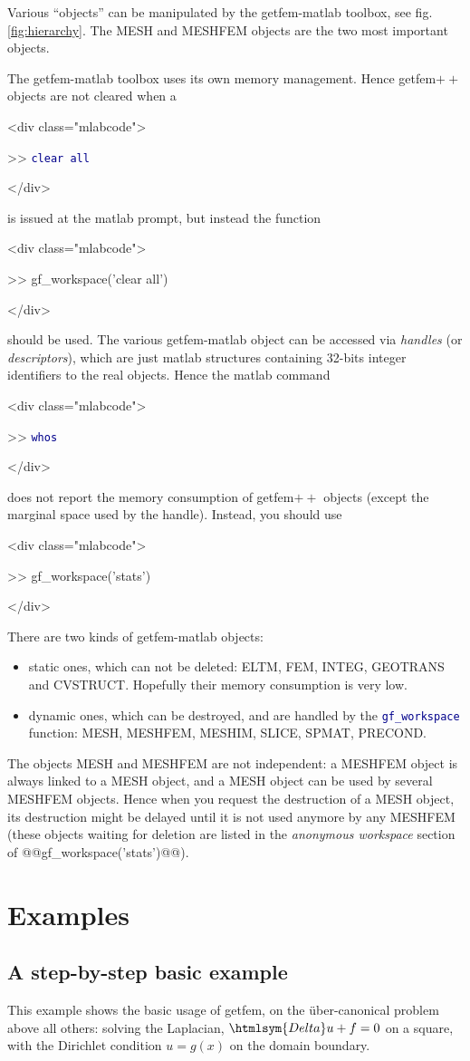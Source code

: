 \documentclass[11pt,a4paper]{article}
\newcommand{\sf}[1]{#1}
\newcommand{\Delta}{\htmlsym{Delta}}
\newcommand{\kw}[1]{\textcolor{darkblue}{\texttt{#1}}}
\newenvironment{matlab}{\begin{rawxml}<div class="mlabcode">\end{rawxml}\begin{example}}{\end{example}\begin{rawxml}</div>\end{rawxml}}
\newcommand{\kw}[1]{\textcolor{darkblue}{\texttt{#1}}}
\newenvironment{matlab}{\begin{alltt}}{\end{alltt}}
\newcommand{\mlab}{{\sf matlab}\xspace}
\newcommand{\gf}{{\sf getfem${++}$}\xspace}
\newcommand{\gfm}{{\sf getfem-matlab}\xspace}
\begin{document}
Various ``objects'' can be manipulated by the \gfm toolbox, see fig. \ref{fig:hierarchy}. The MESH and MESHFEM objects are the two most important objects. 

The \gfm toolbox uses its own memory management. Hence \gf objects are
not cleared when a 
\begin{matlab}
>> \kw{clear all}
\end{matlab}
is issued at the \mlab prompt, but
instead the function 
\begin{matlab}
>> gf\_workspace('clear all')
\end{matlab}
should be used. The various \gfm object can be accessed via \textit{handles} (or
\textit{descriptors}), which are just \mlab structures containing 32-bits integer identifiers to
the real objects. Hence the \mlab command 
\begin{matlab}
>> \kw{whos}
\end{matlab}
does not report the memory consumption of \gf objects (except the marginal space
 used by the handle). Instead, you should use
\begin{matlab}
>> gf\_workspace('stats')
\end{matlab}

There are two kinds of \gfm objects:
\begin{itemize}
\item static ones, which can not be deleted: ELTM, FEM, INTEG,
  GEOTRANS and CVSTRUCT. Hopefully their memory consumption is very low.
\item dynamic ones, which can be destroyed, and are handled by the
  \kw{gf\_workspace} function: MESH, MESHFEM, MESHIM, SLICE, SPMAT, PRECOND.
\end{itemize}
The objects MESH and MESHFEM are not independent: a MESHFEM object is
always linked to a MESH object, and a MESH object can be used by
several MESHFEM objects. Hence when you request the destruction of a
MESH object, its destruction might be delayed until it is not used anymore
by any MESHFEM (these objects waiting for deletion are listed in
the \textit{anonymous workspace} section of
@@gf\_workspace('stats')@@).

\section{Examples}
\subsection{A step-by-step basic example}
This example shows the basic usage of getfem, on the {\"u}ber-canonical
problem above all others: solving the Laplacian, $\Delta u+f=0$ on a
square, with the Dirichlet condition $u=g(x)$ on the domain boundary.
\label{laplacianexample}
\end{document}
